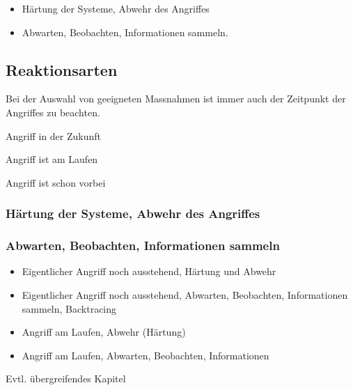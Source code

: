 \begin{itemize}
  \item Härtung der Systeme, Abwehr des Angriffes
  \item Abwarten, Beobachten, Informationen sammeln.
\end{itemize}


\subsection{Reaktionsarten}
Bei der Auswahl von geeigneten Massnahmen ist immer auch der Zeitpunkt der Angriffes zu beachten.

\begin{itemize*}
  \item Angriff in der Zukunft
  \item Angriff ist am Laufen
  \item Angriff ist schon vorbei
\end{itemize*}


\subsubsection{Härtung der Systeme, Abwehr des Angriffes}

\subsubsection{Abwarten, Beobachten, Informationen sammeln}

\begin{itemize}
  \item Eigentlicher Angriff noch ausstehend, Härtung und Abwehr
  \item Eigentlicher Angriff noch ausstehend, Abwarten, Beobachten, Informationen sammeln, Backtracing
  \item Angriff am Laufen, Abwehr (Härtung)
  \item Angriff am Laufen, Abwarten, Beobachten, Informationen
\end{itemize}


Evtl. übergreifendes Kapitel
